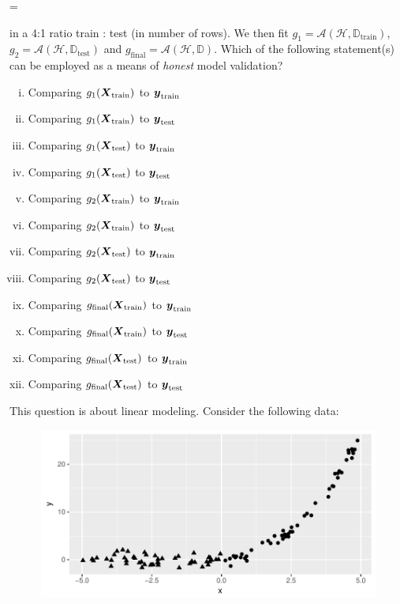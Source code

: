 \documentclass[12pt]{article}
\begin{document}
\beqn
{} = 
\eeqn

\noindent in a 4:1 ratio train : test (in number of rows). We then fit $g_1 = \mathcal{A}(\mathcal{H}, \mathbb{D}_{\text{train}})$, $g_2 = \mathcal{A}(\mathcal{H}, \mathbb{D}_{\text{test}})$ and $g_{\text{final}} = \mathcal{A}(\mathcal{H}, \mathbb{D})$. Which of the following statement(s) can be employed as a means of \textit{honest} model validation?


\begin{enumerate}[i)]
\item Comparing $g_1(\boldsymbol{X}_{\text{train}})$ to $\boldsymbol{y}_{\text{train}}$
\item Comparing $g_1(\boldsymbol{X}_{\text{train}})$ to $\boldsymbol{y}_{\text{test}}$
\item Comparing $g_1(\boldsymbol{X}_{\text{test}})$ to $\boldsymbol{y}_{\text{train}}$
\item Comparing $g_1(\boldsymbol{X}_{\text{test}})$ to $\boldsymbol{y}_{\text{test}}$
\item Comparing $g_2(\boldsymbol{X}_{\text{train}})$ to $\boldsymbol{y}_{\text{train}}$
\item Comparing $g_2(\boldsymbol{X}_{\text{train}})$ to $\boldsymbol{y}_{\text{test}}$
\item Comparing $g_2(\boldsymbol{X}_{\text{test}})$ to $\boldsymbol{y}_{\text{train}}$
\item Comparing $g_2(\boldsymbol{X}_{\text{test}})$ to $\boldsymbol{y}_{\text{test}}$
\item Comparing $g_{\text{final}}(\boldsymbol{X}_{\text{train}})$ to $\boldsymbol{y}_{\text{train}}$
\item Comparing $g_{\text{final}}(\boldsymbol{X}_{\text{train}})$ to $\boldsymbol{y}_{\text{test}}$
\item Comparing $g_{\text{final}}(\boldsymbol{X}_{\text{test}})$ to $\boldsymbol{y}_{\text{train}}$
\item Comparing $g_{\text{final}}(\boldsymbol{X}_{\text{test}})$ to $\boldsymbol{y}_{\text{test}}$
\end{enumerate}

\eenum

\pagebreak

\problem This question is about  linear modeling. Consider the following data:


\begin{figure}[htp]
\centering
\includegraphics[width=5.5in]{nonlinear}
\end{figure}
\end{document}
